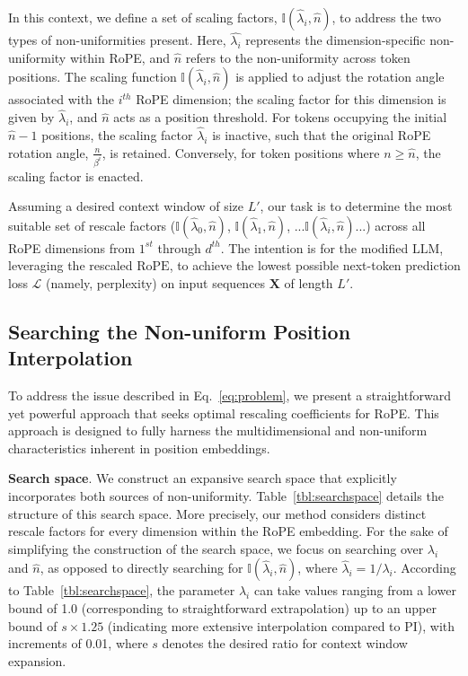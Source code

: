 In this context, we define a set of scaling factors, $\mathbb{I}(\hat{\lambda}_{i},\hat{n})$, to address the two types of non-uniformities present. Here, $\hat{\lambda_i}$ represents the dimension-specific non-uniformity within RoPE, and $\hat{n}$ refers to the non-uniformity across token positions. The scaling function $\mathbb{I}(\hat{\lambda}_{i},\hat{n})$ is applied to adjust the rotation angle associated with the $i^{th}$ RoPE dimension; the scaling factor for this dimension is given by $\hat\lambda_{i}$, and $\hat{n}$ acts as a position threshold. For tokens occupying the initial $\hat{n}-1$ positions, the scaling factor $\hat\lambda_{i}$ is inactive, such that the original RoPE rotation angle, $\frac{n}{\beta^i}$, is retained. Conversely, for token positions where $n \geq \hat{n}$, the scaling factor is enacted.

Assuming a desired context window of size $L'$, our task is to determine the most suitable set of rescale factors ($\mathbb{I}(\hat{\lambda}_{0},\hat{n})$, $\mathbb{I}(\hat{\lambda}_{1},\hat{n})$, ...$\mathbb{I}(\hat{\lambda}_{i},\hat{n})$...) across all RoPE dimensions from $1^{st}$ through $d^{th}$. The intention is for the modified $\text{LLM}$, leveraging the rescaled $\text{RoPE}$, to achieve the lowest possible next-token prediction loss $\mathcal{L}$ (namely, perplexity) on input sequences $\mathbf{X}$ of length $L'$.

\subsection{Searching the Non-uniform Position Interpolation}

To address the issue described in Eq.~\ref{eq:problem}, we present a straightforward yet powerful approach that seeks optimal rescaling coefficients for RoPE. This approach is designed to fully harness the multidimensional and non-uniform characteristics inherent in position embeddings.

\textbf{Search space}. We construct an expansive search space that explicitly incorporates both sources of non-uniformity. Table~\ref{tbl:searchspace} details the structure of this search space. More precisely, our method considers distinct rescale factors for every dimension within the RoPE embedding. For the sake of simplifying the construction of the search space, we focus on searching over $\lambda_i$ and $\hat{n}$, as opposed to directly searching for $\mathbb{I}(\hat{\lambda}_{i},\hat{n})$, where $\hat{\lambda}_{i}=1/\lambda_i$. According to Table~\ref{tbl:searchspace}, the parameter $\lambda_i$ can take values ranging from a lower bound of 1.0 (corresponding to straightforward extrapolation) up to an upper bound of $s\times1.25$ (indicating more extensive interpolation compared to PI), with increments of 0.01, where $s$ denotes the desired ratio for context window expansion.

